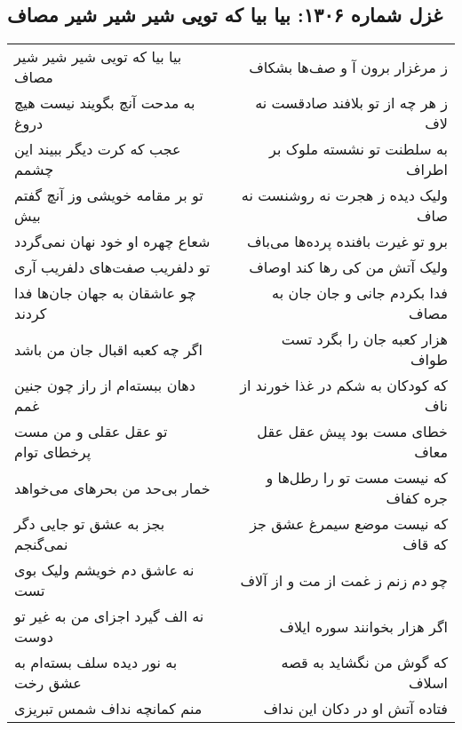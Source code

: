 \begin{center}
\section*{غزل شماره ۱۳۰۶: بیا بیا که تویی شیر شیر شیر مصاف}
\label{sec:1306}
\begin{longtable}{l p{0.5cm} r}
بیا بیا که تویی شیر شیر شیر مصاف
&&
ز مرغزار برون آ و صف‌ها بشکاف
\\
به مدحت آنچ بگویند نیست هیچ دروغ
&&
ز هر چه از تو بلافند صادقست نه لاف
\\
عجب که کرت دیگر ببیند این چشمم
&&
به سلطنت تو نشسته ملوک بر اطراف
\\
تو بر مقامه خویشی وز آنچ گفتم بیش
&&
ولیک دیده ز هجرت نه روشنست نه صاف
\\
شعاع چهره او خود نهان نمی‌گردد
&&
برو تو غیرت بافنده پرده‌ها می‌باف
\\
تو دلفریب صفت‌های دلفریب آری
&&
ولیک آتش من کی رها کند اوصاف
\\
چو عاشقان به جهان جان‌ها فدا کردند
&&
فدا بکردم جانی و جان جان به مصاف
\\
اگر چه کعبه اقبال جان من باشد
&&
هزار کعبه جان را بگرد تست طواف
\\
دهان ببسته‌ام از راز چون جنین غمم
&&
که کودکان به شکم در غذا خورند از ناف
\\
تو عقل عقلی و من مست پرخطای توام
&&
خطای مست بود پیش عقل عقل معاف
\\
خمار بی‌حد من بحرهای می‌خواهد
&&
که نیست مست تو را رطل‌ها و جره کفاف
\\
بجز به عشق تو جایی دگر نمی‌گنجم
&&
که نیست موضع سیمرغ عشق جز که قاف
\\
نه عاشق دم خویشم ولیک بوی تست
&&
چو دم زنم ز غمت از مت و از آلاف
\\
نه الف گیرد اجزای من به غیر تو دوست
&&
اگر هزار بخوانند سوره ایلاف
\\
به نور دیده سلف بسته‌ام به عشق رخت
&&
که گوش من نگشاید به قصه اسلاف
\\
منم کمانچه نداف شمس تبریزی
&&
فتاده آتش او در دکان این نداف
\\
\end{longtable}
\end{center}
